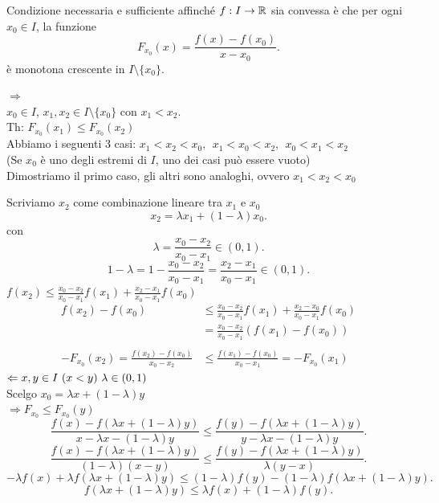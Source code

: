 \documentclass[12px]{article}
\begin{document}
	\begin{teo}
		 Condizione necessaria e sufficiente affinché $f:I \rightarrow \mathbb{R}$ sia convessa è che per ogni $x_0\in I$, la funzione
		 \[
			 F_{x_0}(x) = \frac{f(x)-f(x_0)}{x-x_0}
		 .\] 
		 è monotona crescente in $I\setminus\{x_0\}$.
	\end{teo}
	\begin{dimo}
		$ \Rightarrow $ \\
		$x_0\in I$, $x_1,x_2\in I\setminus\{x_0\}$ con $x_1 < x_2$.\\
		Th: $F_{x_0}(x_1)\leq F_{x_0}(x_2)$ \\
		Abbiamo i seguenti 3 casi: $x_1 < x_2 < x_0, \ \ x_1 < x_0 < x_2, \ \ x_0 < x_1< x_2$ \\
		(Se $x_0$ è uno degli estremi di $I$, uno dei casi può essere vuoto)\\
		Dimostriamo il primo caso, gli altri sono analoghi, ovvero $x_1<x_2<x_0$
		
		Scriviamo $x_2$ come combinazione lineare tra $x_1$ e $x_0$
		\[
		x_2 = \lambda x_1 + (1- \lambda)x_0
		.\] 
		con 
		\[
			\lambda = \frac{x_0-x_2}{x_0-x_1}\in (0,1)
		.\] 
	\[
		1 - \lambda = 1 - \frac{x_0-x_2}{x_0-x_1} = \frac{x_2-x_1}{x_0-x_1}\in (0,1)
	.\]
	$\displaystyle f(x_2)\leq \frac{x_0-x_2}{x_0-x_1}f(x_1) + \frac{x_2-x_1}{x_0-x_1}f(x_0)$
	\[\begin{aligned}
		f(x_2) - f(x_0)&\leq \frac{x_0-x_2}{x_0-x_1}f(x_1) + \frac{x_2-x_0}{x_0-x_1}f(x_0)\\
			       & = \frac{x_0-x_2}{x_0-x_1}(f(x_1)-f(x_0))\\\\
		-F_{x_0}(x_2)=	\frac{f(x_2)-f(x_0)}{x_0-x_2}&\leq \frac{f(x_1)-f(x_0)}{x_0-x_1} = -F_{x_0}(x_1)
\end{aligned}\]
$ \Leftarrow \\
x,y\in I \ (x<y)\ \lambda\in (0,1)$\\
Scelgo $x_0 = \lambda x + (1 - \lambda) y$\\
$ \Rightarrow  F_{x_0}\leq F_{x_0}(y)$ \\
\[
	\frac{f(x) - f( \lambda x + (1- \lambda)y)}{x- \lambda x - (1- \lambda)y}\leq \frac{f(y) - f( \lambda x + (1 - \lambda)y)}{y - \lambda x - (1- \lambda) y}
.\] 
\[
	\frac{f(x) - f( \lambda x + (1- \lambda)y)}{(1- \lambda)(x- y)}\leq \frac{ f(y) - f( \lambda x + (1- \lambda) y)}{ \lambda(y-x)}
.\]
\[
- \lambda f(x) + \lambda f( \lambda x + (1 - \lambda)y) \leq (1- \lambda) f(y) - (1- \lambda)f ( \lambda x + (1- \lambda)y)
.\] 
\[
f( \lambda x + (1- \lambda )y) \leq \lambda f(x) + (1- \lambda) f(y)
.\] 
	\end{dimo}
\end{document}
